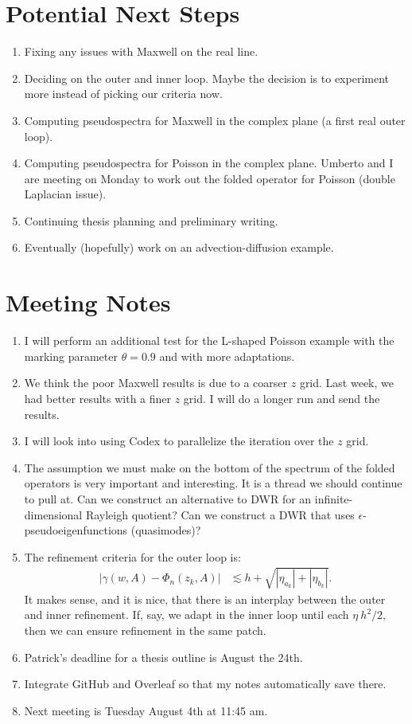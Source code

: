 \documentclass[12pt,a4paper]{article}
\begin{document}
\section{Potential Next Steps}
\begin{enumerate}
    \item Fixing any issues with Maxwell on the real line.
    \item Deciding on the outer and inner loop. Maybe the decision is to experiment more instead of picking our criteria now.
    \item Computing pseudospectra for Maxwell in the complex plane (a first real outer loop). 
    \item Computing pseudospectra for Poisson in the complex plane. Umberto and I are meeting on Monday to work out the folded operator for Poisson (double Laplacian issue). 
    \item Continuing thesis planning and preliminary writing.
    \item Eventually (hopefully) work on an advection-diffusion example. 
\end{enumerate}

\section{Meeting Notes}
\begin{enumerate}
    \item I will perform an additional test for the L-shaped Poisson example with the marking parameter $\theta = 0.9$ and with more adaptations.
    \item We think the poor Maxwell results is due to a coarser $z$ grid. Last week, we had better results with a finer $z$ grid. I will do a longer run and send the results.
    \item I will look into using Codex to parallelize the iteration over the $z$ grid. 
    \item The assumption we must make on the bottom of the spectrum of the folded operators is very important and interesting. It is a thread we should continue to pull at. Can we construct an alternative to DWR for an infinite-dimensional Rayleigh quotient? Can we construct a DWR that uses $\epsilon$-pseudoeigenfunctions (quasimodes)? 
    \item The refinement criteria for the outer loop is:
    \begin{align}
    | \gamma(w, A) - \Phi_n(z_k, A)|
    & \lesssim h + \sqrt{|\eta_{a_k}| + |\eta_{b_k}|}.
\end{align}
It makes sense, and it is nice, that there is an interplay between the outer and inner refinement. If, say, we adapt in the inner loop until each $\eta ~ h^2/2,$ then we can ensure refinement in the same patch. 
\item Patrick's deadline for a thesis outline is August the 24th. 
\item Integrate GitHub and Overleaf so that my notes automatically save there. 
\item Next meeting is Tuesday August 4th at 11:45 am. 
\end{enumerate}
\end{document}

